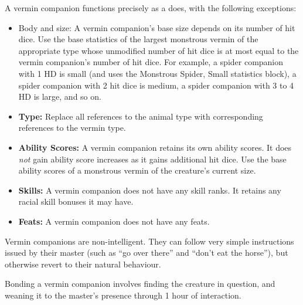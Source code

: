 A vermin companion functions precisely as a  does, with the following exceptions:
\begin{itemize}
 \item Body and size: A vermin companion's base size depends on its number of hit dice. Use the base statistics of the largest monstrous vermin of the appropriate type whose unmodified number of hit dice is at most equal to the vermin companion's number of hit dice. For example, a spider companion with 1 HD is small (and uses the Monstrous Spider, Small statistics block), a spider companion with 2 hit dice is medium, a spider companion with 3 to 4 HD is large, and so on.
 \item \textbf{Type:} Replace all references to the animal type with corresponding references to the vermin type.
 \item \textbf{Ability Scores:} A vermin companion retains its own ability scores.
 It does \emph{not} gain ability score increases as it gains additional hit dice. Use the base ability scores of a monstrous vermin of the creature's current size.
 \item \textbf{Skills:} A vermin companion does not have any skill ranks. It retains any racial skill bonuses it may have. 
 \item \textbf{Feats:} A vermin companion does not have any feats.
\end{itemize}
Vermin companions are non-intelligent. They can follow very simple instructions issued by their master (such as ``go over there'' and ``don't eat the horse''), but otherwise revert to their natural behaviour.

Bonding a vermin companion involves finding the creature in question, and weaning it to the master's presence through 1 hour of interaction.